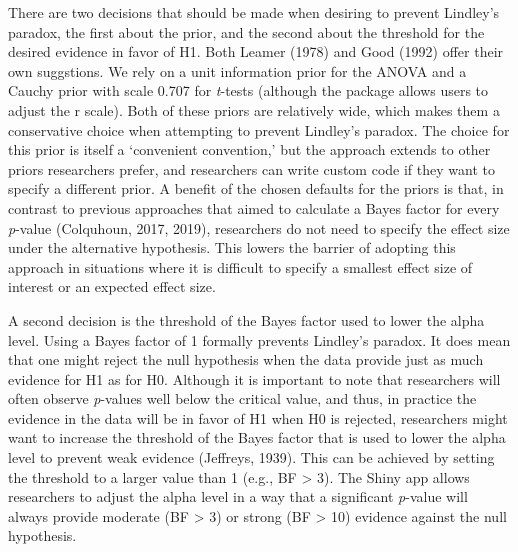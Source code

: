 \documentclass[
  english,
  ,man, a4paper,floatsintext]{apa6}
\begin{document}
There are two decisions that should be made when desiring to prevent Lindley's paradox, the first about the prior, and the second about the threshold for the desired evidence in favor of H1. Both Leamer (1978) and Good (1992) offer their own suggstions. We rely on a unit information prior for the ANOVA and a Cauchy prior with scale 0.707 for \emph{t}-tests (although the package allows users to adjust the r scale). Both of these priors are relatively wide, which makes them a conservative choice when attempting to prevent Lindley's paradox. The choice for this prior is itself a `convenient convention,' but the approach extends to other priors researchers prefer, and researchers can write custom code if they want to specify a different prior. A benefit of the chosen defaults for the priors is that, in contrast to previous approaches that aimed to calculate a Bayes factor for every \emph{p}-value (Colquhoun, 2017, 2019), researchers do not need to specify the effect size under the alternative hypothesis. This lowers the barrier of adopting this approach in situations where it is difficult to specify a smallest effect size of interest or an expected effect size.

A second decision is the threshold of the Bayes factor used to lower the alpha level. Using a Bayes factor of 1 formally prevents Lindley's paradox. It does mean that one might reject the null hypothesis when the data provide just as much evidence for H1 as for H0. Although it is important to note that researchers will often observe \emph{p}-values well below the critical value, and thus, in practice the evidence in the data will be in favor of H1 when H0 is rejected, researchers might want to increase the threshold of the Bayes factor that is used to lower the alpha level to prevent weak evidence (Jeffreys, 1939). This can be achieved by setting the threshold to a larger value than 1 (e.g., BF \textgreater{} 3). The Shiny app allows researchers to adjust the alpha level in a way that a significant \emph{p}-value will always provide moderate (BF \textgreater{} 3) or strong (BF \textgreater{} 10) evidence against the null hypothesis.
\end{document}
